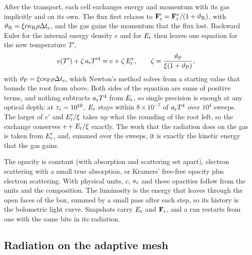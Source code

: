 \documentclass[twocolumn]{aastex701}
\begin{document}
After the transport, each cell exchanges energy and momentum with its gas implicitly and on its own. The flux first relaxes to $\mathbf{F}_{\rm r}' = \mathbf{F}_{\rm r}^*/(1 + \vartheta_{\rm R})$, with $\vartheta_{\rm R} = \xi c\kappa_{\rm R}\rho\Delta t_{\rm s}$, and the gas gains the momentum that the flux lost. Backward Euler for the internal energy density $e$ and for $E_{\rm r}$ then leaves one equation for the new temperature $T'$,
\begin{equation*}
e(T') + \zeta\,a_{\rm r}T'^4 = e + \zeta\,E_{\rm r}^*, \qquad \zeta = \frac{\vartheta_{\rm P}}{\xi(1 + \vartheta_{\rm P})},
\end{equation*}
with $\vartheta_{\rm P} = \xi c\kappa_{\rm P}\rho\Delta t_{\rm s}$, which Newton's method solves from a starting value that bounds the root from above. Both sides of the equation are sums of positive terms, and nothing subtracts $a_{\rm r}T^4$ from $E_{\rm r}$, so single precision is enough at any optical depth: at $\tau_{\rm c} = 10^{10}$, $E_{\rm r}$ stays within $8\times10^{-7}$ of $a_{\rm r}T^4$ over $10^4$ sweeps. The larger of $e'$ and $E_{\rm r}'/\xi$ takes up what the rounding of the root left, so the exchange conserves $e + E_{\rm r}/\xi$ exactly. The work that the radiation does on the gas is taken from $E_{\rm r}'$, and, summed over the sweeps, it is exactly the kinetic energy that the gas gains.

The opacity is constant (with absorption and scattering set apart), electron scattering with a small true absorption, or Kramers' free-free opacity plus electron scattering. With physical units, $c$, $a_{\rm r}$ and these opacities follow from the units and the composition. The luminosity is the energy that leaves through the open faces of the box, summed by a small pass after each step, so its history is the bolometric light curve. Snapshots carry $E_{\rm r}$ and $\mathbf{F}_{\rm r}$, and a run restarts from one with the same bits in its radiation.

\subsection{Radiation on the adaptive mesh}
\label{sec:radamr}
\end{document}
